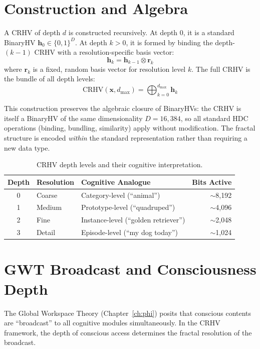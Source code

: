 \documentclass[12pt]{book}
\newcommand{\bind}{\otimes}
\newcommand{\dimHDC}{16{,}384}
\begin{document}
\section{Construction and Algebra}

A CRHV of depth $d$ is constructed recursively. At depth 0, it is a standard BinaryHV $\mathbf{h}_0 \in \{0,1\}^D$. At depth $k > 0$, it is formed by binding the depth-$(k-1)$ CRHV with a resolution-specific basis vector:
\begin{equation}
\mathbf{h}_k = \mathbf{h}_{k-1} \bind \mathbf{r}_k
\end{equation}
where $\mathbf{r}_k$ is a fixed, random basis vector for resolution level $k$. The full CRHV is the bundle of all depth levels:
\begin{equation}
\text{CRHV}(\mathbf{x}, d_{\max}) = \bigoplus_{k=0}^{d_{\max}} \mathbf{h}_k
\end{equation}

This construction preserves the algebraic closure of BinaryHVs: the CRHV is itself a BinaryHV of the same dimensionality $D = \dimHDC$, so all standard HDC operations (binding, bundling, similarity) apply without modification. The fractal structure is encoded \textit{within} the standard representation rather than requiring a new data type.

\begin{table}[htbp]
\centering
\caption{CRHV depth levels and their cognitive interpretation.}
\label{tab:crhv-depths}
\begin{tabular}{@{}cllr@{}}
\toprule
\textbf{Depth} & \textbf{Resolution} & \textbf{Cognitive Analogue} & \textbf{Bits Active} \\
\midrule
0 & Coarse   & Category-level (``animal'')       & $\sim$8,192 \\
1 & Medium   & Prototype-level (``quadruped'')    & $\sim$4,096 \\
2 & Fine     & Instance-level (``golden retriever'') & $\sim$2,048 \\
3 & Detail   & Episode-level (``my dog today'')   & $\sim$1,024 \\
\bottomrule
\end{tabular}
\end{table}

\section{GWT Broadcast and Consciousness Depth}

The Global Workspace Theory (Chapter~\ref{ch:phi}) posits that conscious contents are ``broadcast'' to all cognitive modules simultaneously. In the CRHV framework, the depth of conscious access determines the fractal resolution of the broadcast.
\end{document}
